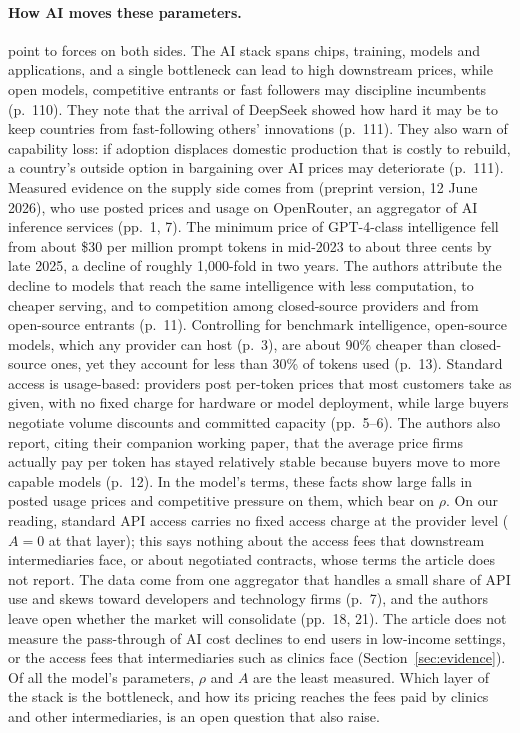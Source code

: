 \documentclass[12pt]{article}
\theoremstyle{remark}
\begin{document}
\paragraph{How AI moves these parameters.} \citet[pp.~110--111]{athey2026competition} point to forces on both sides. The AI stack spans chips, training, models and applications, and a single bottleneck can lead to high downstream prices, while open models, competitive entrants or fast followers may discipline incumbents (p.~110). They note that the arrival of DeepSeek showed how hard it may be to keep countries from fast-following others' innovations (p.~111). They also warn of capability loss: if adoption displaces domestic production that is costly to rebuild, a country's outside option in bargaining over AI prices may deteriorate (p.~111). Measured evidence on the supply side comes from \citet{demirer2026market} (preprint version, 12 June 2026), who use posted prices and usage on OpenRouter, an aggregator of AI inference services (pp.~1, 7). The minimum price of GPT-4-class intelligence fell from about \$30 per million prompt tokens in mid-2023 to about three cents by late 2025, a decline of roughly 1,000-fold in two years. The authors attribute the decline to models that reach the same intelligence with less computation, to cheaper serving, and to competition among closed-source providers and from open-source entrants (p.~11). Controlling for benchmark intelligence, open-source models, which any provider can host (p.~3), are about 90\% cheaper than closed-source ones, yet they account for less than 30\% of tokens used (p.~13). Standard access is usage-based: providers post per-token prices that most customers take as given, with no fixed charge for hardware or model deployment, while large buyers negotiate volume discounts and committed capacity (pp.~5--6). The authors also report, citing their companion working paper, that the average price firms actually pay per token has stayed relatively stable because buyers move to more capable models (p.~12). In the model's terms, these facts show large falls in posted usage prices and competitive pressure on them, which bear on $\rho$. On our reading, standard API access carries no fixed access charge at the provider level ($A=0$ at that layer); this says nothing about the access fees that downstream intermediaries face, or about negotiated contracts, whose terms the article does not report. The data come from one aggregator that handles a small share of API use and skews toward developers and technology firms (p.~7), and the authors leave open whether the market will consolidate (pp.~18, 21). The article does not measure the pass-through of AI cost declines to end users in low-income settings, or the access fees that intermediaries such as clinics face (Section~\ref{sec:evidence}). Of all the model's parameters, $\rho$ and $A$ are the least measured. Which layer of the stack is the bottleneck, and how its pricing reaches the fees paid by clinics and other intermediaries, is an open question that \citet[p.~110]{athey2026competition} also raise.
\end{document}
